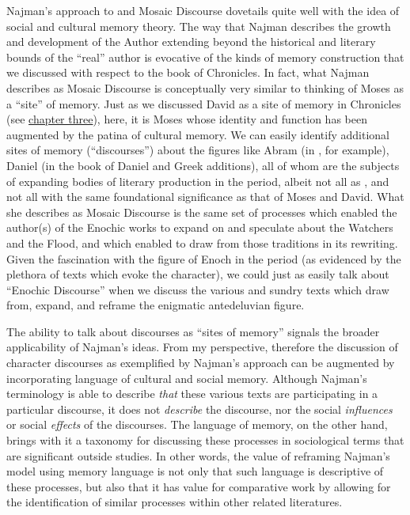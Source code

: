 Najman's approach to \jub and Mosaic Discourse dovetails quite well with the idea of social and cultural memory theory. The way that Najman describes the growth and development of the Author extending beyond the historical and literary bounds of the ``real'' author is evocative of the kinds of memory construction that we discussed with respect to the book of Chronicles. In fact, what Najman describes as Mosaic Discourse is conceptually very similar to thinking of Moses as a ``site'' of memory. Just as we discussed David as a site of memory in Chronicles (see \hyperref[chap:chronicles]{chapter three}), here, it is Moses whose identity and function has been augmented by the patina of cultural memory. We can easily identify additional sites of memory (``discourses'') about the figures like Abram (in \ga, for example), Daniel (in the book of Daniel and Greek additions), all of whom are the subjects of expanding bodies of literary production in the \secondtemple period, albeit not all as \psa, and not all with the same foundational significance as that of Moses and David. What she describes as Mosaic Discourse is the same set of processes which enabled the author(s) of the Enochic works to expand on and speculate about the Watchers and the Flood, and which enabled \ga to draw from those traditions in its rewriting. Given the fascination with the figure of Enoch in the \secondtemple period (as evidenced by the plethora of texts which evoke the character), we could just as easily talk about ``Enochic Discourse'' when we discuss the various and sundry texts which draw from, expand, and reframe the enigmatic antedeluvian figure.

The ability to talk about discourses as ``sites of memory'' signals the broader applicability of Najman's ideas. From my perspective, therefore the discussion of character discourses as exemplified by Najman's approach can be augmented by incorporating language of cultural and social memory.  Although Najman's terminology is able to describe \emph{that} these various texts are participating in a particular discourse, it does not \emph{describe} the discourse, nor the social \emph{influences} or social \emph{effects} of the discourses. The language of memory, on the other hand, brings with it a taxonomy for discussing these processes in sociological terms that are significant outside \secondtemple studies. In other words, the value of reframing Najman's model using memory language is not only that such language is descriptive of these processes, but also that it has value for comparative work by allowing for the identification of similar processes within other related literatures.

